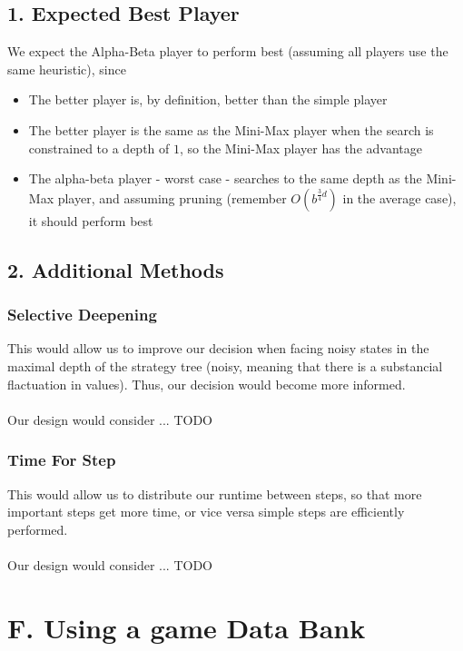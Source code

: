 \documentclass{article}
\begin{document}
\subsection*{1. Expected Best Player}
We expect the Alpha-Beta player to perform best (assuming all players use the same heuristic), since
\begin{itemize}
\item The better player is, by definition, better than the simple player
\item The better player is the same as the Mini-Max player when the search is constrained to a depth of $1$, so the Mini-Max player has the advantage
\item The alpha-beta player - worst case - searches to the same depth as the Mini-Max player, and assuming pruning (remember $O(b^{\frac{3}{4} d})$ in the average case), it should perform best
\end{itemize}

\subsection*{2. Additional Methods}
\subsubsection*{Selective Deepening}
This would allow us to improve our decision when facing noisy states in the maximal depth of the strategy tree (noisy, meaning that there is a substancial flactuation in values). Thus, our decision would become more informed. \\~\\
Our design would consider ... TODO

\subsubsection*{Time For Step}
This would allow us to distribute our runtime between steps, so that more important steps get more time, or vice versa simple steps are efficiently performed. \\~\\
Our design would consider ... TODO

\section*{F. Using a game Data Bank}
\end{document}
